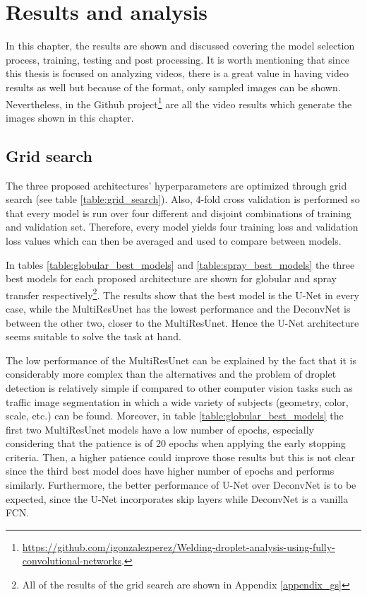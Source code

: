 \chapter{Results and analysis}
In this chapter, the results are shown and discussed covering the model selection process, training, testing and post processing. It is worth mentioning that since this thesis is focused on analyzing videos, there is a great value in having video results as well but because of the format, only sampled images can be shown. Nevertheless, in the Github project\footnote{\url{https://github.com/igonzalezperez/Welding-droplet-analysis-using-fully-convolutional-networks}.} are all the video results which generate the images shown in this chapter.

\section{Grid search}
The three proposed architectures' hyperparameters are optimized through grid search (see table \ref{table:grid_search}). Also, 4-fold cross validation is performed so that every model is run over four different and disjoint combinations of training and validation set. Therefore, every model yields four training loss and validation loss values which can then be averaged and used to compare between models. 

In tables \ref{table:globular_best_models} and \ref{table:spray_best_models} the three best models for each proposed architecture are shown for globular and spray transfer respectively\footnote{All of the results of the grid search are shown in Appendix \ref{appendix_gs}}. The results show that the best model is the U-Net in every case, while the MultiResUnet has the lowest performance and the DeconvNet is between the other two, closer to the MultiResUnet. Hence the U-Net architecture seems suitable to solve the task at hand. 

The low performance of the MultiResUnet can be explained by the fact that it is considerably more complex than the alternatives and the problem of droplet detection is relatively simple if compared to other computer vision tasks such as traffic image segmentation in which a wide variety of subjects (geometry, color, scale, etc.) can be found. Moreover, in table \ref{table:globular_best_models} the first two MultiResUnet models have a low number of epochs, especially considering that the patience is of 20 epochs when applying the early stopping criteria. Then, a higher patience could improve those results but this is not clear since the third best model does have higher number of epochs and performs similarly. Furthermore, the better performance of U-Net over DeconvNet is to be expected, since the U-Net incorporates skip layers while DeconvNet is a vanilla FCN.

